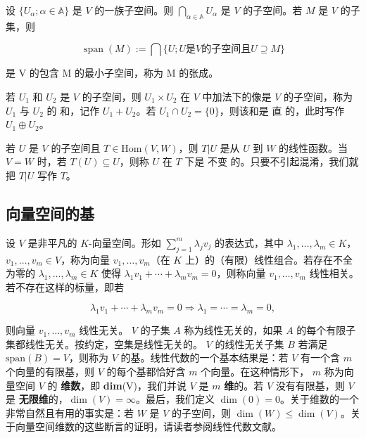 \begin{example}
\begin{items}
设 $\{U_\alpha; \alpha \in \mathbb{A}\}$ 是 $V$ 的一族子空间。则 $\bigcap_{\alpha \in \mathbb{A}} U_\alpha$ 是 $V$ 的子空间。若 $M$ 是 $V$ 的子集，则

\[
\operatorname{span}(M):=\bigcap\{U;U\text{是}V\text{的子空间且}U\supseteq M\}
\]

是 V 的包含 M 的最小子空间，称为 M 的张成。

\item

若 $U_1$ 和 $U_2$ 是 $V$ 的子空间，则 $U_1 \times U_2$ 在 $V$ 中加法下的像是 $V$ 的子空间，称为 $U_1$ 与 $U_2$ 的 $\text{和}$，记作 $U_1 + U_2$。若 $U_1 \cap U_2 = \{0\}$，则该和是 $\text{直}$ 的，此时写作 $U_1 \oplus U_2$。

\item

若 $U$ 是 $V$ 的子空间且 $T \in \mathrm{Hom}(V, W)$，则 $T|U$ 是从 $U$ 到 $W$ 的线性函数。当 $V = W$ 时，若 $T(U) \subseteq U$，则称 $U$ 在 $T$ 下是 $\mathbf{不变}$ 的。只要不引起混淆，我们就把 $T|U$ 写作 $T$。

\end{items}

\end{example}

\subsection*{向量空间的基}

设 $V$ 是非平凡的 $K$-向量空间。形如 $\sum_{j=1}^{m} \lambda_{j} v_{j}$ 的表达式，其中 $\lambda_{1}, \ldots, \lambda_{m} \in K$，$v_{1}, \ldots, v_{m} \in V$，称为向量 $v_{1}, \ldots, v_{m}$（在 $K$ 上）的（有限）线性组合。若存在不全为零的 $\lambda_{1}, \ldots, \lambda_{m} \in K$ 使得 $\lambda_{1} v_{1} + \cdots + \lambda_{m} v_{m} = 0$，则称向量 $v_{1}, \ldots, v_{m}$ 线性相关。若不存在这样的标量，即若

\[
\lambda_{1}v_{1}+\cdots+\lambda_{m}v_{m}=0\Rightarrow\lambda_{1}=\cdots=\lambda_{m}=0,
\]

则向量  $ v_1, \ldots, v_m $ 线性无关。 $ V $ 的子集  $ A $ 称为线性无关的，如果  $ A $ 的每个有限子集都线性无关。按约定，空集是线性无关的。 $ V $ 的线性无关子集  $ B $ 若满足  $ \text{span}(B) = V $，则称为  $ V $ 的基。线性代数的一个基本结果是：若  $ V $ 有一个含  $ m $ 个向量的有限基，则  $ V $ 的每个基都恰好含  $ m $ 个向量。在这种情形下， $ m $ 称为向量空间  $ V $ 的 \textbf{维数}，即 \textbf{dim}(V)，我们并说  $ V $ 是  $ m $ \textbf{维}的。若  $ V $ 没有有限基，则  $ V $ 是 \textbf{无限维}的，$ \dim(V) = \infty $。最后，我们定义 $ \dim(0) = 0 $。关于维数的一个非常自然且有用的事实是：若 $ W $ 是 $ V $ 的子空间，则 $ \dim(W) \leq \dim(V) $。关于向量空间维数的这些断言的证明，请读者参阅线性代数文献。

